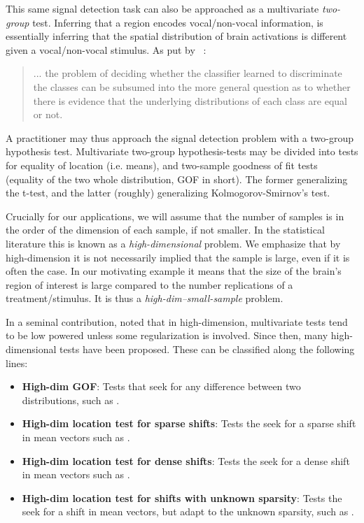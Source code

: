 \documentclass[]{bio}
\begin{document}
This same signal detection task can also be approached as a multivariate \emph{two-group} test.
Inferring that a region encodes vocal/non-vocal information, is essentially inferring that the spatial distribution of brain activations is different given a vocal/non-vocal stimulus. 
As put by ~\cite{pereira_machine_2009}: 
\begin{quote}
	... the problem of deciding whether the classifier learned to discriminate the classes can be subsumed into the more general question as to whether there is evidence that the underlying distributions of each class are equal or not.
\end{quote}
A practitioner may thus approach the signal detection problem with a two-group hypothesis test.
Multivariate two-group hypothesis-tests may be divided into tests for equality of location (i.e. means), and two-sample goodness of fit tests (equality of the two whole distribution, GOF in short).
The former generalizing the t-test, and the latter (roughly) generalizing Kolmogorov-Smirnov's test.


Crucially for our applications, we will assume that the number of samples is in the order of the dimension of each sample, if not smaller. 
In the statistical literature this is known as a \emph{high-dimensional} problem. 
We emphasize that by high-dimension it is not necessarily implied that the sample is large, even if it is often the case. 
In our motivating example it means that the size of the brain's region of interest is large compared to the number replications of a treatment/stimulus. 
It is thus a \emph{high-dim--small-sample} problem. 

In a seminal contribution, \citet{bai1996effect} noted that in high-dimension, multivariate tests tend to be low powered unless some regularization is involved. 
Since then, many high-dimensional tests have been proposed. 
These can be classified along the following lines:
\begin{itemize}
	\item \textbf{High-dim GOF}: Tests that seek for any difference between two distributions, such as  \cite{hall2002permutation,szekely_brownian_2009,gretton_kernel_2012-1}.
	
	\item \textbf{High-dim location test for sparse shifts}: Tests the seek for a sparse shift in mean vectors such as \cite{tony2014two,chang2014simulation}.
	
	\item \textbf{High-dim location test for dense shifts}: Tests the seek for a dense shift in mean vectors such as  \cite{dempster1958high,bai1996effect,schafer_shrinkage_2005,goeman2006testing,srivastava_multivariate_2007,lopes2011more,nishiyama2013testing,thulin2014high,shen2015adaptive,xu2016adaptive,zhang2016high}.
	
	\item \textbf{High-dim location test for shifts with unknown sparsity}: Tests the seek for a shift in mean vectors, but adapt to the unknown sparsity, such as \cite{donoho2004higher,zhong2013tests,moscovich2016exact}.
	
\end{itemize}
\end{document}
